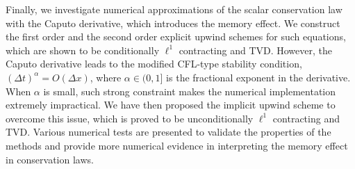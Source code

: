 \begin{englishabstract}
Finally, we investigate numerical approximations of  the scalar conservation law with the Caputo derivative, which introduces the memory effect.  We construct the first order and the second order explicit upwind schemes for such equations, which are shown to be conditionally $\ell^1$ contracting and TVD. However, the Caputo derivative leads to the modified CFL-type stability condition, $ (\Delta t)^{\alpha} = O(\Delta x)$, where $\alpha \in (0,1]$ is the fractional exponent in the derivative. When $\alpha$ is small, such strong constraint makes the numerical implementation extremely impractical. We have then proposed the implicit upwind scheme to overcome this issue, which is proved to be unconditionally $\ell^1$ contracting and TVD. Various numerical tests are presented to validate the properties of the methods and provide more numerical evidence in interpreting  the memory effect in conservation laws. 



\end{englishabstract}

